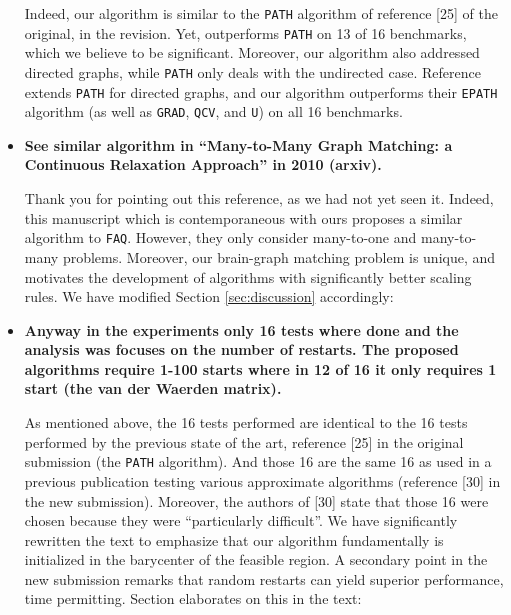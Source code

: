 \begin{itemize}
Indeed, our algorithm is similar to the \texttt{PATH} algorithm of reference [25] of the original, \cite{Zaslavskiy2009} in the revision.  Yet, \FAQ outperforms \texttt{PATH} on 13 of 16 benchmarks, which we believe to be significant.  Moreover, our algorithm also addressed directed graphs, while \texttt{PATH} only deals with the undirected case.  Reference  \cite{Liu2012} extends \texttt{PATH} for directed graphs, and our algorithm outperforms their \texttt{EPATH} algorithm (as well as \texttt{GRAD}, \texttt{QCV}, and \texttt{U}) on all 16 benchmarks.

	\item \textbf{See similar algorithm in ``Many-to-Many Graph Matching: a Continuous Relaxation Approach'' in 2010 (arxiv).}

Thank you for pointing out this reference, as we had not yet seen it.  Indeed, this manuscript which is contemporaneous with ours proposes a similar algorithm to \texttt{FAQ}.  However, they only consider many-to-one and many-to-many problems. Moreover, our brain-graph matching problem is unique, and motivates the development of algorithms with significantly better scaling rules.  We have modified Section \ref{sec:discussion} accordingly:



	\item \textbf{Anyway in the experiments only 16 tests where done and the analysis was focuses on the number of restarts. The proposed algorithms require 1-100 starts where in 12 of 16 it only requires 1 start (the van der Waerden matrix).}

As mentioned above, the 16 tests performed are identical to the 16 tests performed by the previous state of the art, reference [25] in the original submission (the \texttt{PATH} algorithm).  And those 16 are the same 16 as used in a previous publication testing various approximate algorithms (reference [30] in the new submission).  Moreover, the authors of [30] state that those 16 were chosen because they were ``particularly difficult''.  We have significantly rewritten the text to emphasize that our algorithm fundamentally is initialized in the barycenter of the feasible region.  A secondary point in the new submission remarks that random restarts can yield superior performance, time permitting. Section elaborates on this in the text:
	

\end{itemize}
